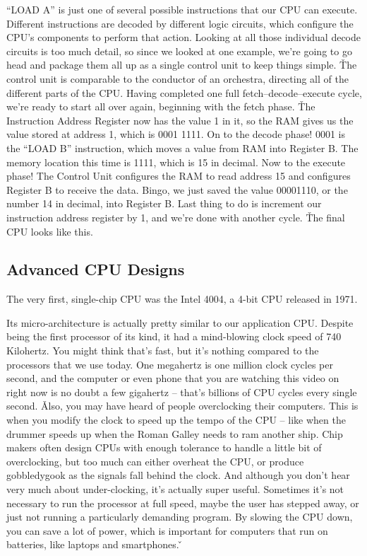 
``LOAD A'' is just one of several possible instructions that our CPU can execute. Different instructions are decoded
by different logic circuits, which configure the CPU's components to perform that action. Looking at all those
individual decode circuits is too much detail, so since we looked at one example, we're going to go head and package
them all up as a single control unit to keep things simple. \v

The control unit is comparable to the conductor of an orchestra, directing all of the different parts of the CPU.
Having completed one full fetch–decode–execute cycle, we're ready to start all over again, beginning with the fetch
phase. \v

The Instruction Address Register now has the value 1 in it, so the RAM gives us the value stored at address 1, which
is 0001 1111. On to the decode phase! 0001 is the ``LOAD B'' instruction, which moves a value from RAM into Register
B. The memory location this time is 1111, which is 15 in decimal. Now to the execute phase! The Control Unit
configures the RAM to read address 15 and configures Register B to receive the data. Bingo, we just saved the value
00001110, or the number 14 in decimal, into Register B. Last thing to do is increment our instruction address
register by 1, and we're done with another cycle. \v

The final CPU looks like this.


\subsection{Advanced CPU Designs}

The very first, single-chip CPU was the Intel 4004, a 4-bit CPU released in 1971.


Its micro-architecture is actually pretty similar to our application CPU. Despite being the first processor of its
kind, it had a mind-blowing clock speed of 740 Kilohertz. You might think that's fast, but it's nothing compared to
the processors that we use today. One megahertz is one million clock cycles per second, and the computer or even
phone that you are watching this video on right now is no doubt a few gigahertz -- that's billions of CPU cycles
every single second. \v

Also, you may have heard of people overclocking their computers. This is when you modify the clock to speed up the
tempo of the CPU -- like when the drummer speeds up when the Roman Galley needs to ram another ship. Chip makers
often design CPUs with enough tolerance to handle a little bit of overclocking, but too much can either overheat the
CPU, or produce gobbledygook as the signals fall behind the clock. And although you don't hear very much about
under-clocking, it's actually super useful. Sometimes it's not necessary to run the processor at full speed, maybe
the user has stepped away, or just not running a particularly demanding program. By slowing the CPU down, you can
save a lot of power, which is important for computers that run on batteries, like laptops and smartphones. \v

